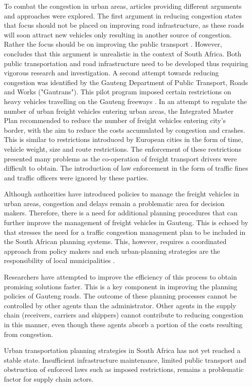 To combat the congestion in urban areas, articles providing different arguments and approaches were explored. The first argument in reducing congestion states that focus should not be placed on improving road infrastructure, as these roads will soon attract new vehicles only resulting in another source of congestion. Rather the focus should be on improving the public transport \citep{garner2001towards}. However, \citet{garner2001towards} concludes that this argument is unrealistic in the context of South Africa. Both public transportation and road infrastructure need to be developed thus requiring vigorous research and investigation. A second attempt towards reducing congestion was identified by the Gauteng Department of Public Transport, Roads and Works ("Gautrans"). This pilot program imposed certain restrictions on heavy vehicles travelling on the Gauteng freeways \citep{markman2003gauteng}. In an attempt to regulate the number of urban freight vehicles entering urban areas, the Integrated Master Plan recommended to reduce the number of freight vehicles entering city's border, with the aim to reduce the costs accumulated by congestion and crashes. This is similar to restrictions introduced by European cities in the form of time, vehicle weight, size and route restrictions. The enforcement of these restrictions presented many problems as the co-operation of freight transport drivers were difficult to obtain. The introduction of law enforcement in the form of traffic fines and traffic officers were ignored by these parties. \par
Although authorities have introduced policies to manage the freight vehicles in urban areas, congestion and delays remain a problematic area for decision makers. Therefore, there is a need for additional planning procedures that can further improve the management of freight vehicles in Gauteng.
This is echoed by \citet{heyns2013traffic} that stresses the need for a traffic congestion management plan to be included in the South African planning systems. This, however, requires a coordinated approach from policy makers and such urban-planning strategies are the responsibility of local municipalities \citep{heyns2013traffic}.\par
Researchers have attempted to improve the efficiency of this process to obtain promising solutions faster. This is a key component in improving the planning policies of Gauteng roads. The outcome of these planning processes cannot be controlled by other agents than the administrator. Other agents in the supply chain (receivers, carriers and shippers) cannot contribute to reducing congestion in this manner, even though these agents absorb a portion of the costs resulting from congestion. \par

Urban transportation planning strategies in South Africa has not yet reached a stable state. Insufficient infrastructure maintenance, limited public transport and obstruction of enforced laws such as imposed restrictions, remains a problematic factor for supply chain actors.\\


